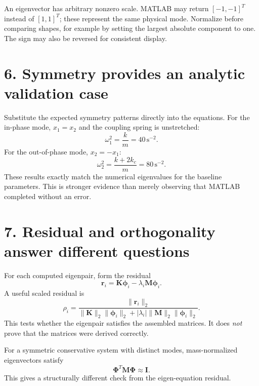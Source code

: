 \documentclass[11pt,a4paper]{article}
\begin{document}
An eigenvector has arbitrary nonzero scale. MATLAB may return $[-1,-1]^T$ instead of $[1,1]^T$; these represent the same physical mode. Normalize before comparing shapes, for example by setting the largest absolute component to one. The sign may also be reversed for consistent display.

\section*{6. Symmetry provides an analytic validation case}
Substitute the expected symmetry patterns directly into the equations. For the in-phase mode, $x_1=x_2$ and the coupling spring is unstretched:
\begin{equation}
 \omega_1^2=\frac{k}{m}=40\,\mathrm{s^{-2}}.
\end{equation}
For the out-of-phase mode, $x_2=-x_1$:
\begin{equation}
 \omega_2^2=\frac{k+2k_c}{m}=80\,\mathrm{s^{-2}}.
\end{equation}
These results exactly match the numerical eigenvalues for the baseline parameters. This is stronger evidence than merely observing that MATLAB completed without an error.

\section*{7. Residual and orthogonality answer different questions}
For each computed eigenpair, form the residual
\begin{equation}
 \mathbf{r}_i=\mathbf{K}\boldsymbol{\phi}_i-\lambda_i\mathbf{M}\boldsymbol{\phi}_i.
\end{equation}
A useful scaled residual is
\begin{equation}
 \rho_i=\frac{\|\mathbf{r}_i\|_2}{\|\mathbf{K}\|_2\|\boldsymbol{\phi}_i\|_2+|\lambda_i|\|\mathbf{M}\|_2\|\boldsymbol{\phi}_i\|_2}.
\end{equation}
This tests whether the eigenpair satisfies the assembled matrices. It does \emph{not} prove that the matrices were derived correctly.

For a symmetric conservative system with distinct modes, mass-normalized eigenvectors satisfy
\begin{equation}
 \boldsymbol{\Phi}^T\mathbf{M}\boldsymbol{\Phi}\approx\mathbf{I}.
\end{equation}
This gives a structurally different check from the eigen-equation residual.
\end{document}

